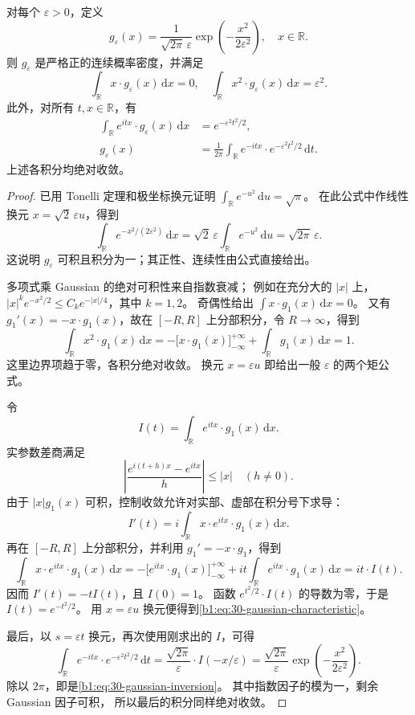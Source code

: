 \begin{lemma}\label{b1:lem:30-gaussian-fourier}
对每个 \(\varepsilon>0\)，定义
\[
 g_\varepsilon(x)=\frac{1}{\sqrt{2\pi}\,\varepsilon}
       \exp\left(-\frac{x^2}{2\varepsilon^2}\right),
 \quad x\in\mathbb R.
\]
则 \(g_\varepsilon\) 是严格正的连续概率密度，并满足
\[
 \int_{\mathbb R}x\cdot g_\varepsilon(x)\,\mathrm dx=0,
 \quad
 \int_{\mathbb R}x^2\cdot g_\varepsilon(x)\,\mathrm dx=\varepsilon^2.
\]
此外，对所有 \(t,x\in\mathbb R\)，有
\begin{align}
 \int_{\mathbb R}e^{itx}\cdot g_\varepsilon(x)\,\mathrm dx
   &=e^{-\varepsilon^2t^2/2},
       \label{b1:eq:30-gaussian-characteristic}\\
 g_\varepsilon(x)
   &=\frac{1}{2\pi}\int_{\mathbb R}
       e^{-itx}\cdot e^{-\varepsilon^2t^2/2}\,\mathrm dt.
       \label{b1:eq:30-gaussian-inversion}
\end{align}
上述各积分均绝对收敛。
\end{lemma}
\begin{proof}
已用 Tonelli 定理和极坐标换元证明
\(\int_{\mathbb R}e^{-u^2}\,\mathrm du=\sqrt\pi\)。
在此公式中作线性换元 \(x=\sqrt2\,\varepsilon u\)，得到
\[
 \int_{\mathbb R}e^{-x^2/(2\varepsilon^2)}\,\mathrm dx
 =\sqrt2\,\varepsilon\int_{\mathbb R}e^{-u^2}\,\mathrm du
 =\sqrt{2\pi}\,\varepsilon.
\]
这说明 \(g_\varepsilon\) 可积且积分为一；其正性、连续性由公式直接给出。

多项式乘 Gaussian 的绝对可积性来自指数衰减；
例如在充分大的 \(|x|\) 上，
\(|x|^k e^{-x^2/2}\leq C_k e^{-|x|/4}\)，其中 \(k=1,2\)。
奇偶性给出 \(\int x\cdot g_1(x)\,\mathrm dx=0\)。
又有 \(g_1'(x)=-x\cdot g_1(x)\)，故在 \([-R,R]\) 上分部积分，令 \(R\to\infty\)，得到
\[
 \int_{\mathbb R}x^2\cdot g_1(x)\,\mathrm dx
 =-\bigl[x\cdot g_1(x)\bigr]_{-\infty}^{+\infty}
     +\int_{\mathbb R}g_1(x)\,\mathrm dx
 =1.
\]
这里边界项趋于零，各积分绝对收敛。
换元 \(x=\varepsilon u\) 即给出一般 \(\varepsilon\) 的两个矩公式。

令
\[
 I(t)=\int_{\mathbb R}e^{itx}\cdot g_1(x)\,\mathrm dx.
\]
实参数差商满足
\[
 \left|\frac{e^{i(t+h)x}-e^{itx}}{h}\right|\leq|x|
 \quad(h\ne0).
\]
由于 \(|x|g_1(x)\) 可积，控制收敛允许对实部、虚部在积分号下求导：
\[
 I'(t)=i\int_{\mathbb R}x\cdot e^{itx}\cdot g_1(x)\,\mathrm dx.
\]
再在 \([-R,R]\) 上分部积分，并利用 \(g_1'=-x\cdot g_1\)，得到
\[
 \int_{\mathbb R}x\cdot e^{itx}\cdot g_1(x)\,\mathrm dx
 =-\bigl[e^{itx}\cdot g_1(x)\bigr]_{-\infty}^{+\infty}
       +it\int_{\mathbb R}e^{itx}\cdot g_1(x)\,\mathrm dx
 =it\cdot I(t).
\]
因而 \(I'(t)=-tI(t)\)，且 \(I(0)=1\)。
函数 \(e^{t^2/2}\cdot I(t)\) 的导数为零，于是
\(I(t)=e^{-t^2/2}\)。
用 \(x=\varepsilon u\) 换元便得到\eqref{b1:eq:30-gaussian-characteristic}。

最后，以 \(s=\varepsilon t\) 换元，再次使用刚求出的 \(I\)，可得
\[
 \int_{\mathbb R}e^{-itx}\cdot e^{-\varepsilon^2t^2/2}\,\mathrm dt
 =\frac{\sqrt{2\pi}}{\varepsilon}\cdot I(-x/\varepsilon)
 =\frac{\sqrt{2\pi}}{\varepsilon}
       \exp\left(-\frac{x^2}{2\varepsilon^2}\right).
\]
除以 \(2\pi\)，即是\eqref{b1:eq:30-gaussian-inversion}。
其中指数因子的模为一，剩余 Gaussian 因子可积，
所以最后的积分同样绝对收敛。
\end{proof}

